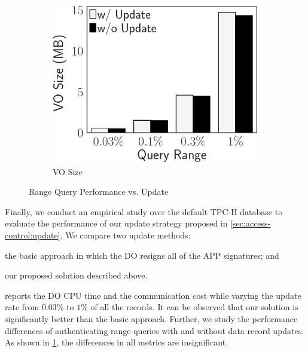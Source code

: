 \begin{figure}[t]
\begin{subfigure}{.33\linewidth}
        \includegraphics[height=\ht\figbox]{exp-figs/access-control/update_vo.eps}
        \caption{VO Size}
    \end{subfigure}
    \caption{Range Query Performance vs. Update}\label{exp-fig:access-control:update}
\end{figure}

Finally, we conduct an empirical study over the default TPC-H database to evaluate the performance of our update strategy proposed in \cref{sec:access-control:update}. We compare two update methods:
\begin{inlineenum}
    \item the basic approach in which the DO resigns all of the APP signatures; and
    \item our proposed solution described above.
\end{inlineenum}
 reports the DO CPU time and the communication cost while varying the update rate from $0.03\%$ to $1\%$ of all the records. It can be observed that our solution is significantly better than the basic approach. Further, we study the performance differences of authenticating range queries with and without data record updates. As shown in \cref{exp-fig:access-control:update}, the differences in all metrics are insignificant.

